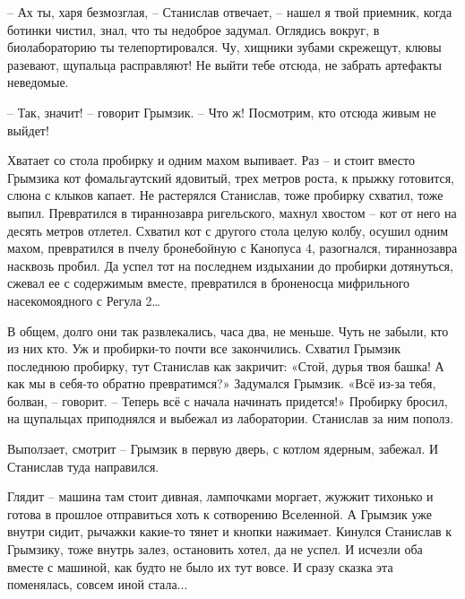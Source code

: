 \documentclass[ebook,oneside,final,openright]{memoir}
\begin{document}
– Ах ты, харя безмозглая, – Станислав отвечает, – нашел я твой приемник, когда ботинки чистил, знал, что ты недоброе задумал. Оглядись вокруг, в биолабораторию ты телепортировался. Чу, хищники зубами скрежещут, клювы разевают, щупальца расправляют! Не выйти тебе отсюда, не забрать артефакты неведомые.\par
– Так, значит! – говорит Грымзик. – Что ж! Посмотрим, кто отсюда живым не выйдет!\par
\par
Хватает со стола пробирку и одним махом выпивает. Раз – и стоит вместо Грымзика кот фомальгаутский ядовитый, трех метров роста, к прыжку готовится, слюна с клыков капает. Не растерялся Станислав, тоже пробирку схватил, тоже выпил. Превратился в тираннозавра ригельского, махнул хвостом – кот от него на десять метров отлетел. Схватил кот с другого стола целую колбу, осушил одним махом, превратился в пчелу бронебойную с Канопуса 4, разогнался, тираннозавра насквозь пробил. Да успел тот на последнем издыхании до пробирки дотянуться, сжевал ее с содержимым вместе, превратился в броненосца мифрильного насекомоядного с Регула 2…\par
\par
В общем, долго они так развлекались, часа два, не меньше. Чуть не забыли, кто из них кто. Уж и пробирки-то почти все закончились. Схватил Грымзик последнюю пробирку, тут Станислав как закричит: «Стой, дурья твоя башка! А как мы в себя-то обратно превратимся?» Задумался Грымзик. «Всё из-за тебя, болван, – говорит. – Теперь всё с начала начинать придется!» Пробирку бросил, на щупальцах приподнялся и выбежал из лаборатории. Станислав за ним пополз.\par
\par
Выползает, смотрит – Грымзик в первую дверь, с котлом ядерным, забежал. И Станислав туда направился.\par
\par
Глядит – машина там стоит дивная, лампочками моргает, жужжит тихонько и готова в прошлое отправиться хоть к сотворению Вселенной. А Грымзик уже внутри сидит, рычажки какие-то тянет и кнопки нажимает. Кинулся Станислав к Грымзику, тоже внутрь залез, остановить хотел, да не успел. И исчезли оба вместе с машиной, как будто не было их тут вовсе. И сразу сказка эта поменялась, совсем иной стала...\par
\end{document}
